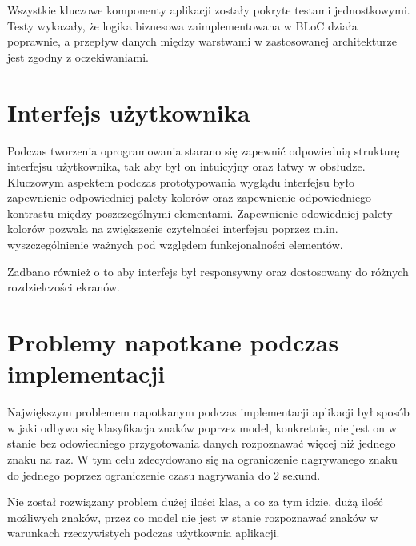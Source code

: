 Wszystkie kluczowe komponenty aplikacji zostały pokryte testami jednostkowymi.
Testy wykazały, że logika biznesowa zaimplementowana w BLoC działa poprawnie, a przepływ danych między warstwami w zastosowanej architekturze jest zgodny z oczekiwaniami.

\section{Interfejs użytkownika}
Podczas tworzenia oprogramowania starano się zapewnić odpowiednią strukturę interfejsu użytkownika, tak aby był on intuicyjny oraz łatwy w obsłudze.
Kluczowym aspektem podczas prototypowania wyglądu interfejsu było zapewnienie odpowiedniej palety kolorów oraz zapewnienie odpowiedniego kontrastu między poszczególnymi elementami.
Zapewnienie odowiedniej palety kolorów pozwala na zwiększenie czytelności interfejsu poprzez m.in. wyszczególnienie ważnych pod względem funkcjonalności elementów.

Zadbano również o to aby interfejs był responsywny oraz dostosowany do różnych rozdzielczości ekranów.

\section{Problemy napotkane podczas implementacji}
Największym problemem napotkanym podczas implementacji aplikacji był sposób w jaki odbywa się klasyfikacja znaków poprzez model, konkretnie, nie jest on w stanie bez odowiedniego przygotowania danych rozpoznawać więcej niż jednego znaku na raz.
W tym celu zdecydowano się na ograniczenie nagrywanego znaku do jednego poprzez ograniczenie czasu nagrywania do 2 sekund.

Nie został rozwiązany problem dużej ilości klas, a co za tym idzie, dużą ilość możliwych znaków, przez co model nie jest w stanie rozpoznawać znaków w warunkach rzeczywistych podczas użytkownia aplikacji.
